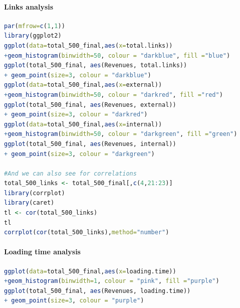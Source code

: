 \documentclass{article}
\begin{document}
\paragraph{Links analysis}\label{r: van: l}
\begin{lstlisting}[language=R] 
par(mfrow=c(1,1))
library(ggplot2)
ggplot(data=total_500_final,aes(x=total.links))
+geom_histogram(binwidth=50, colour = "darkblue", fill ="blue")
ggplot(total_500_final, aes(Revenues, total.links)) 
+ geom_point(size=3, colour = "darkblue")
ggplot(data=total_500_final,aes(x=external))
+geom_histogram(binwidth=50, colour = "darkred", fill ="red")
ggplot(total_500_final, aes(Revenues, external)) 
+ geom_point(size=3, colour = "darkred")
ggplot(data=total_500_final,aes(x=internal))
+geom_histogram(binwidth=50, colour = "darkgreen", fill ="green")
ggplot(total_500_final, aes(Revenues, internal)) 
+ geom_point(size=3, colour = "darkgreen")

#And we can also see for correlations
total_500_links <- total_500_final[,c(4,21:23)]
library(corrplot)
library(caret)
tl <- cor(total_500_links)
tl
corrplot(cor(total_500_links),method="number")

 \end{lstlisting}
 
 
\paragraph{Loading time analysis}\label{r: van: load}
\begin{lstlisting}[language=R] 
ggplot(data=total_500_final,aes(x=loading.time))
+geom_histogram(binwidth=1, colour = "pink", fill ="purple")
ggplot(total_500_final, aes(Revenues, loading.time)) 
+ geom_point(size=3, colour = "purple")
 \end{lstlisting}
\end{document}
